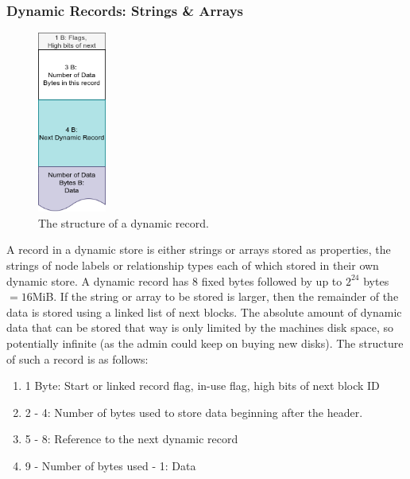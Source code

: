 \documentclass[a4paper,10pt]{article}
\begin{document}
        \subsubsection{Dynamic Records: Strings \& Arrays}\label{dynamic}
            \begin{figure}[htp]\label{dynamic_rec}
                \begin{center}
                    \includegraphics[keepaspectratio,height=0.2\textheight,width=0.2\textwidth]{img/03_record/dynamic.png}
                \end{center}
                \caption{The structure of a dynamic record.} %
            \end{figure}
            A record in a dynamic store is either strings or arrays stored as properties,  the strings of node labels or relationship types each of which stored in their own dynamic store. A dynamic record has 8 fixed bytes followed by up to $2^{24}$ bytes $= 16 $MiB. If the string or array to be stored is larger, then the remainder of the data is stored using a linked list of next blocks. The absolute amount of dynamic data that can be stored that way is only limited by the machines disk space, so potentially infinite (as the admin could keep on buying new disks). 
            The structure of such a record is as follows:
            \begin{enumerate}
                \item 1 Byte: Start or linked record flag, in-use flag, high bits of next block ID
                \item 2 - 4: Number of bytes used to store data beginning after the header.
                \item 5 - 8: Reference to the next dynamic record
                \item 9 - Number of bytes used - 1: Data
            \end{enumerate}
            
\end{document}
